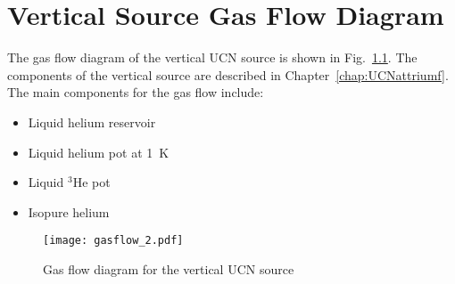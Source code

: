 \chapter{ Vertical Source Gas Flow Diagram\label{app:gasflow}}
The gas flow diagram of the vertical UCN source is shown in
Fig.~\ref{fig:gasflow}. The components of the vertical source are
described in Chapter~\ref{chap:UCNattriumf}. The main components for
the gas flow include:
\begin{itemize}
\item Liquid helium reservoir
\item Liquid helium pot at 1~K
\item Liquid $^3$He pot
\item Isopure helium
\end{itemize}
\begin{figure}[h]
  \centering
    \texttt{[image: gasflow\_2.pdf]}
    \caption{ Gas flow diagram for the vertical UCN source }
    \label{fig:gasflow}
\end{figure}